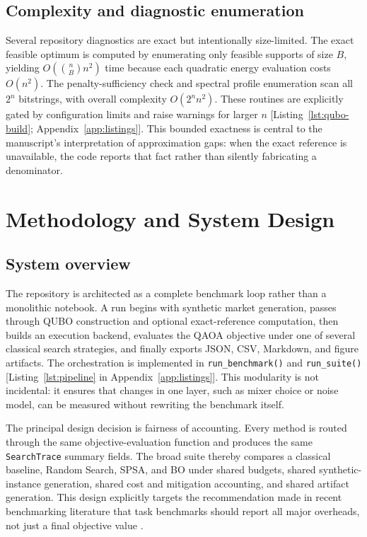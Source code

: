 \documentclass[11pt]{article}
\begin{document}
\subsection{Complexity and diagnostic enumeration}

Several repository diagnostics are exact but intentionally size-limited. The exact feasible optimum is computed by enumerating only feasible supports of size \(B\), yielding \(O(\binom{n}{B}n^2)\) time because each quadratic energy evaluation costs \(O(n^2)\). The penalty-sufficiency check and spectral profile enumeration scan all \(2^n\) bitstrings, with overall complexity \(O(2^n n^2)\). These routines are explicitly gated by configuration limits and raise warnings for larger \(n\) [Listing~\ref{lst:qubo-build}; Appendix~\ref{app:listings}]. This bounded exactness is central to the manuscript's interpretation of approximation gaps: when the exact reference is unavailable, the code reports that fact rather than silently fabricating a denominator.

\section{Methodology and System Design}\label{sec:methodology}

\subsection{System overview}

The repository is architected as a complete benchmark loop rather than a monolithic notebook. A run begins with synthetic market generation, passes through QUBO construction and optional exact-reference computation, then builds an execution backend, evaluates the QAOA objective under one of several classical search strategies, and finally exports JSON, CSV, Markdown, and figure artifacts. The orchestration is implemented in \texttt{run\_benchmark()} and \texttt{run\_suite()} [Listing~\ref{lst:pipeline} in Appendix~\ref{app:listings}]. This modularity is not incidental: it ensures that changes in one layer, such as mixer choice or noise model, can be measured without rewriting the benchmark itself.

The principal design decision is fairness of accounting. Every method is routed through the same objective-evaluation function and produces the same \texttt{SearchTrace} summary fields. The broad suite thereby compares a classical baseline, Random Search, SPSA, and BO under shared budgets, shared synthetic-instance generation, shared cost and mitigation accounting, and shared artifact generation. This design explicitly targets the recommendation made in recent benchmarking literature that task benchmarks should report all major overheads, not just a final objective value \cite{proctor2025benchmarking,nation2025benchpress}.
\end{document}
